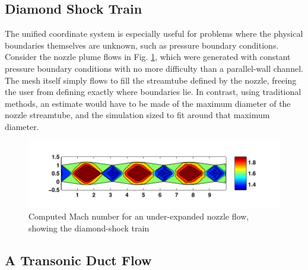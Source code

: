 \documentclass[12pt,letterpaper]{article}
\begin{document}
\subsection{Diamond Shock Train}
The unified coordinate system is especially useful for problems where the physical boundaries themselves are unknown, such as pressure boundary conditions. Consider the nozzle plume flows in Fig. \ref{fig:nozzle_flow}, which were generated with constant pressure boundary conditions with no more difficulty than a parallel-wall channel. The mesh itself simply flows to fill 
the streamtube defined by the nozzle, freeing the user from defining
exactly where boundaries lie. In contrast, using traditional methods, an estimate would have to be made of the maximum diameter of the nozzle streamtube, and the simulation sized to fit around that maximum diameter.

\begin{figure}[htbp]
   \centering
   \includegraphics[width=\textwidth]{diamond_shock_train.pdf}
   \caption[Computed Mach Number for Diamond Shock Train]{Computed Mach number for an under-expanded nozzle flow, showing the diamond-shock train}
   \label{fig:nozzle_flow}
\end{figure}


\subsection{A Transonic Duct Flow}
\end{document}
